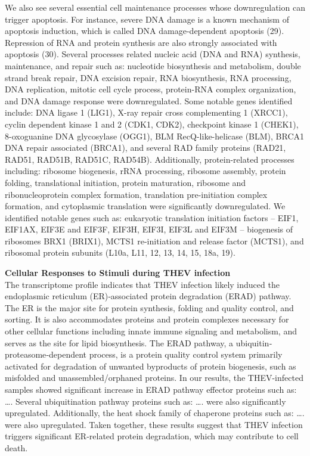 \documentclass[
]{article}
\begin{document}
We also see several essential cell maintenance processes whose
downregulation can trigger apoptosis. For instance, severe DNA damage is
a known mechanism of apoptosis induction, which is called DNA
damage-dependent apoptosis (29). Repression of RNA and protein synthesis
are also strongly associated with apoptosis (30). Several processes
related nucleic acid (DNA and RNA) synthesis, maintenance, and repair
such as: nucleotide biosynthesis and metabolism, double strand break
repair, DNA excision repair, RNA biosynthesis, RNA processing, DNA
replication, mitotic cell cycle process, protein-RNA complex
organization, and DNA damage response were downregulated. Some notable
genes identified include: DNA ligase 1 (LIG1), X-ray repair cross
complementing 1 (XRCC1), cyclin dependent kinase 1 and 2 (CDK1, CDK2),
checkpoint kinase 1 (CHEK1), 8-oxoguanine DNA glycosylase (OGG1), BLM
RecQ-like-helicase (BLM), BRCA1 DNA repair associated (BRCA1), and
several RAD family proteins (RAD21, RAD51, RAD51B, RAD51C, RAD54B).
Additionally, protein-related processes including: ribosome biogenesis,
rRNA processing, ribosome assembly, protein folding, translational
initiation, protein maturation, ribosome and ribonucleoprotein complex
formation, translation pre-initiation complex formation, and cytoplasmic
translation were significantly downregulated. We identified notable
genes such as: eukaryotic translation initiation factors -- EIF1,
EIF1AX, EIF3E and EIF3F, EIF3H, EIF3I, EIF3L and EIF3M -- biogenesis of
ribosomes BRX1 (BRIX1), MCTS1 re-initiation and release factor (MCTS1),
and ribosomal protein subunits (L10a, L11, 12, 13, 14, 15, 18a, 19).

\textbf{Cellular Responses to Stimuli during THEV infection}\\
The transcriptome profile indicates that THEV infection likely induced
the endoplasmic reticulum (ER)‐associated protein degradation (ERAD)
pathway. The ER is the major site for protein synthesis, folding and
quality control, and sorting. It is also accommodates proteins and
protein complexes necessary for other cellular functions including
innate immune signaling and metabolism, and serves as the site for lipid
biosynthesis. The ERAD pathway, a ubiquitin‐proteasome‐dependent
process, is a protein quality control system primarily activated for
degradation of unwanted byproducts of protein biogenesis, such as
misfolded and unassembled/orphaned proteins. In our results, the
THEV-infected samples showed significant increase in ERAD pathway
effector proteins such as: \ldots. Several ubiquitination pathway
proteins such as: \ldots. were also significantly upregulated.
Additionally, the heat shock family of chaperone proteins such as:
\ldots. were also upregulated. Taken together, these results suggest
that THEV infection triggers significant ER-related protein degradation,
which may contribute to cell death.
\end{document}
